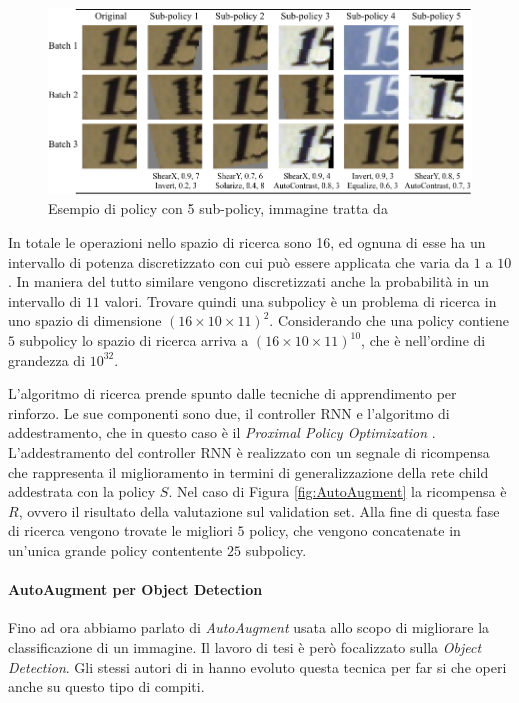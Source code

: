 \begin{figure}[]
    \centering
    \includegraphics[width=\textwidth]{images/svhn_viz_policy2.png}
    \caption{Esempio di policy con 5 sub-policy, immagine tratta da \cite{DBLP:journals/corr/abs-1805-09501}}
    \label{fig:policy}
\end{figure} 


In totale le operazioni nello spazio di ricerca sono 16, ed ognuna di esse ha un intervallo di potenza discretizzato con cui può essere applicata che varia da $1$ a $10$. In maniera del tutto similare vengono discretizzati anche la probabilità in un intervallo di $11$ valori. Trovare quindi una subpolicy è un problema di ricerca in uno spazio di dimensione $(16 \times 10 \times 11)^2$. Considerando che una policy contiene $5$ subpolicy lo spazio di ricerca arriva a $(16 \times 10 \times 11)^{10}$, che è nell'ordine di grandezza di $10^{32}$.


L'algoritmo di ricerca prende spunto dalle tecniche di apprendimento per rinforzo. Le sue componenti sono due, il controller \ac{RNN} e l'algoritmo di addestramento, che in questo caso è il \textit{Proximal Policy Optimization} \cite{DBLP:journals/corr/SchulmanWDRK17}. L'addestramento del controller \ac{RNN} è realizzato con un segnale di ricompensa che rappresenta il miglioramento in termini di generalizzazione della rete child addestrata con la policy $S$. Nel caso di Figura \ref{fig:AutoAugment} la ricompensa è $R$, ovvero il risultato della valutazione sul validation set. Alla fine di questa fase di ricerca vengono trovate le migliori $5$ policy, che vengono concatenate in un'unica grande policy contentente $25$ subpolicy.
\paragraph{AutoAugment per Object Detection}
Fino ad ora abbiamo parlato di \textit{AutoAugment} usata allo scopo di migliorare la classificazione di un immagine. Il lavoro di tesi è però focalizzato sulla \textit{Object Detection}. Gli stessi autori di \cite{DBLP:journals/corr/abs-1805-09501} in \cite{DBLP:journals/corr/abs-1906-11172} hanno evoluto questa tecnica per far si che operi anche su questo tipo di compiti.



